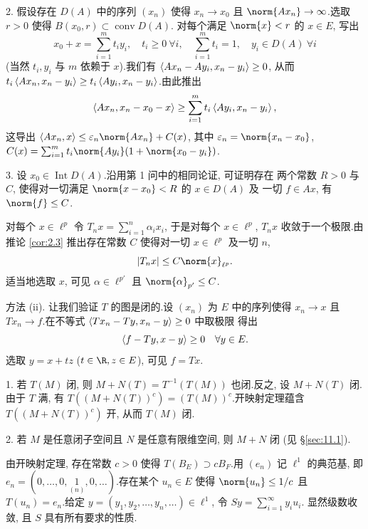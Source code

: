 2. 假设存在 $D(A)$ 中的序列 $(x_n)$ 使得 $x_n\to x_0$ 且
$\norm{Ax_n}\to\infty$.选取 $r>0$ 使得 $B(x_0,r)\subset\operatorname{conv}D(A)$.
对每个满足 $\norm{x}<r$ 的 $x\in E$, 写出
\begin{equation*}
x_0+x=\sum_{i=1}^m t_iy_i,\quad t_i\ge0\ \forall i,\quad
\sum_{i=1}^m t_i=1,\quad y_i\in D(A)\ \forall i
\end{equation*}
(当然 $t_i,y_i$ 与 $m$ 依赖于 $x$).我们有 $\left\langle Ax_n-Ay_i,x_n-y_i\right\rangle\ge0$,
从而 $t_i\left\langle Ax_n,x_n-y_i\right\rangle\ge t_i\left\langle Ay_i,x_n-y_i\right\rangle$.由此推出
\begin{equation*}
\left\langle Ax_n,x_n-x_0-x\right\rangle\ge\sum_{i=1}^m t_i\left\langle Ay_i,x_n-y_i\right\rangle,
\end{equation*}
这导出 $\dual{Ax_n}{x}\le\varepsilon_n\norm{Ax_n}+C(x)$, 其中
$\varepsilon_n=\norm{x_n-x_0}$,
$C(x)=\sum_{i=1}^m t_i\norm{Ay_i}(1+\norm{x_0-y_i})$.

3. 设 $x_0\in\operatorname{Int}D(A)$.沿用第 1 问中的相同论证, 可证明存在
两个常数 $R>0$ 与 $C$, 使得对一切满足 $\norm{x-x_0}<R$ 的 $x\in D(A)$ 及
一切 $f\in Ax$, 有 $\norm{f}\le C$.


对每个 $x\in\ell^p$ 令 $T_nx=\sum_{i=1}^n\alpha_ix_i$, 于是对每个
$x\in\ell^p$, $T_nx$ 收敛于一个极限.由推论  \ref{cor:2.3} 推出存在常数 $C$
使得对一切 $x\in\ell^p$ 及一切 $n$,
\begin{equation*}
\abs{T_nx}\le C\norm{x}_{\ell^p}.
\end{equation*}
适当地选取 $x$, 可见 $\alpha\in\ell^{p'}$ 且 $\norm{\alpha}_{p'}\le C$.


方法 (ii). 让我们验证 $T$ 的图是闭的.设 $(x_n)$ 为 $E$ 中的序列使得
$x_n\to x$ 且 $Tx_n\to f$.在不等式 $\left\langle Tx_n-Ty,x_n-y\right\rangle\ge0$ 中取极限
得出
\begin{equation*}
\left\langle f-Ty,x-y\right\rangle\ge0\quad\forall y\in E.
\end{equation*}
选取 $y=x+tz$ ($t\in\R,z\in E$), 可见 $f=Tx$.


1. 若 $T(M)$ 闭, 则 $M+N(T)=T^{-1}(T(M))$ 也闭.反之, 设 $M+N(T)$ 闭.
由于 $T$ 满, 有 $T((M+N(T))^c)=(T(M))^c$.开映射定理蕴含 $T((M+N(T))^c)$ 开,
从而 $T(M)$ 闭.

2. 若 $M$ 是任意闭子空间且 $N$ 是任意有限维空间, 则 $M+N$ 闭 (见 \S \ref{sec:11.1}).


由开映射定理, 存在常数 $c>0$ 使得 $T(B_E)\supset cB_F$.用 $(e_n)$ 记
$\ell^1$ 的典范基, 即 $e_n=(0,\dots,0,\underset{(n)}{1},0,\dots)$.存在某个
$u_n\in E$ 使得 $\norm{u_n}\le1/c$ 且 $T(u_n)=e_n$.给定
$y=(y_1,y_2,\dots,y_n,\dots)\in\ell^1$, 令 $Sy=\sum_{i=1}^\infty y_iu_i$.
显然级数收敛, 且 $S$ 具有所有要求的性质.


